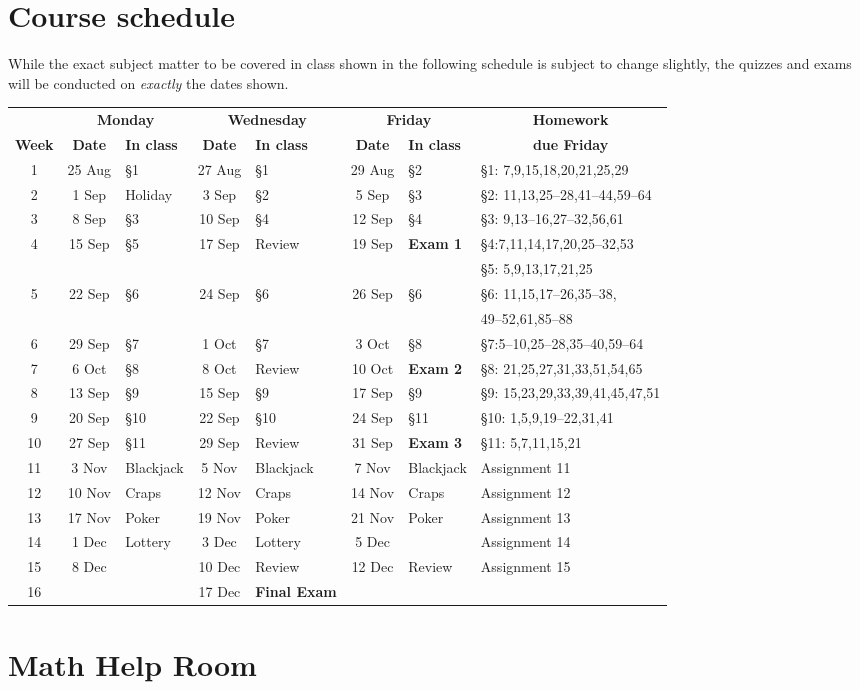 \documentclass[11pt]{article}
\begin{document}
\section{Course schedule}\label{Schedule} While the exact subject
matter to be covered in class shown in the following schedule is
subject to change slightly, the quizzes and exams will be conducted
on {\em exactly} the dates shown.

\begin{tabular}{c|cl|cl|cl|l}
&\multicolumn{2}{c|}{\bf Monday}
&\multicolumn{2}{c|}{\bf Wednesday}
&\multicolumn{2}{c}{\bf Friday}&\multicolumn{1}{c}{\bf Homework}\\
{\bf Week}&{\bf Date}&{\bf In class}
&{\bf Date}&{\bf In class}&{\bf Date}&{\bf In class}&\multicolumn{1}{c}{\bf due Friday}\\\toprule
1&25 Aug&\S1&27 Aug&\S1&29 Aug&\S2&\S1: 7,9,15,18,20,21,25,29\\\midrule
2&1 Sep&Holiday&3 Sep&\S2&5 Sep&\S3&\S2: 11,13,25--28,41--44,59--64\\\midrule
3&8 Sep&\S3&10 Sep&\S4&12 Sep&\S4&\S3: 9,13--16,27--32,56,61\\\midrule
4&15 Sep&\S5&17 Sep&Review&19 Sep&{\bf Exam 1}&\S4:7,11,14,17,20,25--32,53\\
&&&&&&&\S5: 5,9,13,17,21,25\\\midrule
5&22 Sep&\S6&24 Sep&\S6&26 Sep&\S6&\S6: 11,15,17--26,35--38,\\
&&&&&&&49--52,61,85--88\\\midrule
6&29 Sep&\S7&1 Oct&\S7&3 Oct&\S8&\S7:5--10,25--28,35--40,59--64\\\midrule
7&6 Oct&\S8&8 Oct&Review&10 Oct&{\bf Exam 2}&\S8: 21,25,27,31,33,51,54,65\\\midrule
8&13 Sep&\S9&15 Sep&\S9&17 Sep&\S9&\S9: 15,23,29,33,39,41,45,47,51\\\midrule
9&20 Sep&\S10&22 Sep&\S10&24 Sep&\S11&\S10: 1,5,9,19--22,31,41\\\midrule
10&27 Sep&\S11&29 Sep&Review&31 Sep&{\bf Exam 3}&\S11: 5,7,11,15,21\\\midrule
11&3 Nov&Blackjack&5 Nov&Blackjack&7 Nov&Blackjack&Assignment 11\\\midrule
12&10 Nov&Craps&12 Nov&Craps&14 Nov&Craps&Assignment 12\\\midrule
13&17 Nov&Poker&19 Nov&Poker&21 Nov&Poker&Assignment 13\\\midrule
14&1 Dec&Lottery&3 Dec&Lottery&5 Dec&&Assignment 14\\\midrule
15&8 Dec&&10 Dec&Review&12 Dec&Review&Assignment 15\\\midrule
16&&&17 Dec&{\bf Final Exam}&&
\end{tabular}

\section{Math Help Room}\label{MathCenter}
\end{document}
